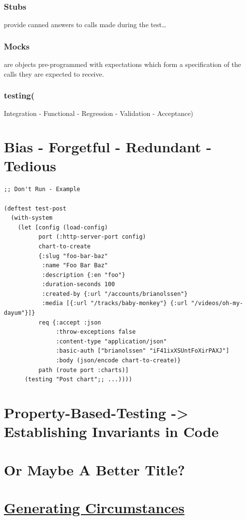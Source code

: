 \documentclass[11pt]{article}
\begin{document}
\subsubsection{Stubs}
\label{sec-15-0-3}
provide canned answers to calls made during the test\ldots{}
\subsubsection{Mocks}
\label{sec-15-0-4}
are objects pre-programmed with expectations which form a specification
of the calls they are expected to receive.
\subsubsection{testing(}
\label{sec-15-0-5}
Integration - Functional - Regression - Validation - Acceptance)
\section{Bias - Forgetful - Redundant - Tedious}
\label{sec-16}

\begin{verbatim}
;; Don't Run - Example

(deftest test-post
  (with-system
    (let [config (load-config)
          port (:http-server-port config)
          chart-to-create
          {:slug "foo-bar-baz"
           :name "Foo Bar Baz"
           :description {:en "foo"}
           :duration-seconds 100
           :created-by {:url "/accounts/brianolssen"}
           :media [{:url "/tracks/baby-monkey"} {:url "/videos/oh-my-dayum"}]}
          req {:accept :json
               :throw-exceptions false
               :content-type "application/json"
               :basic-auth ["brianolssen" "iF41ixXSUntFoXirPAXJ"]
               :body (json/encode chart-to-create)}
          path (route port :charts)]
      (testing "Post chart";; ...))))
\end{verbatim}
\section{Property-Based-Testing -> Establishing Invariants in Code}
\label{sec-17}
\section{Or Maybe A Better Title?}
\label{sec-18}
\section{\href{http://alexey.radul.name/ideas/2014/testing-revisited/}{Generating Circumstances}}
\label{sec-19}
\end{document}
